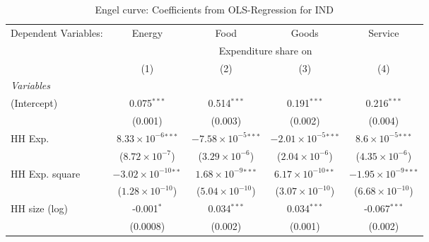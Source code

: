 
\begin{table}[htbp!]
   \centering
   \small
   \begin{adjustbox}{width = 1\textwidth, max height = 0.95\textheight, center}
      \begin{threeparttable}[b]
         \caption{\label{tab:Engel_parametric_IND} Engel curve: Coefficients from OLS-Regression for IND}
         \begin{tabular}{lcccc}
            \tabularnewline \midrule \midrule
            Dependent Variables: & Energy                         & Food                           & Goods                          & Service\\  
             & \multicolumn{4}{c}{Expenditure share on} \\ 
                                 & (1)                            & (2)                            & (3)                            & (4)\\  
            \midrule
            \emph{Variables}\\
            (Intercept)          & 0.075$^{***}$                  & 0.514$^{***}$                  & 0.191$^{***}$                  & 0.216$^{***}$\\   
                                 & (0.001)                        & (0.003)                        & (0.002)                        & (0.004)\\   
            HH Exp.              & $8.33\times 10^{-6}$$^{***}$   & $-7.58\times 10^{-5}$$^{***}$  & $-2.01\times 10^{-5}$$^{***}$  & $8.6\times 10^{-5}$$^{***}$\\    
                                 & ($8.72\times 10^{-7}$)         & ($3.29\times 10^{-6}$)         & ($2.04\times 10^{-6}$)         & ($4.35\times 10^{-6}$)\\    
            HH Exp. square       & $-3.02\times 10^{-10}$$^{**}$  & $1.68\times 10^{-9}$$^{***}$   & $6.17\times 10^{-10}$$^{**}$   & $-1.95\times 10^{-9}$$^{***}$\\    
                                 & ($1.28\times 10^{-10}$)        & ($5.04\times 10^{-10}$)        & ($3.07\times 10^{-10}$)        & ($6.68\times 10^{-10}$)\\    
            HH size (log)        & -0.001$^{*}$                   & 0.034$^{***}$                  & 0.034$^{***}$                  & -0.067$^{***}$\\   
                                 & (0.0008)                       & (0.002)                        & (0.001)                        & (0.002)\\   

\end{tabular}
\end{threeparttable}
\end{adjustbox}
\end{table}
